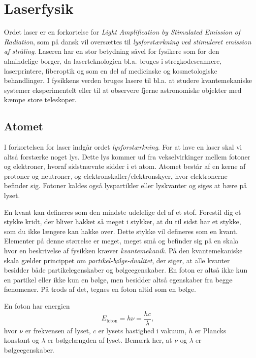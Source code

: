 \chapter{Laserfysik}
Ordet laser er en forkortelse for \emph{Light Amplification by Stimulated Emission of Radiation}, som på dansk vil oversættes til \emph{lysforstærkning ved stimuleret emission af stråling}. Laseren har en stor betydning såvel for fysikere som for den almindelige borger, da laserteknologien bl.a. bruges i stregkodescannere,
laserprintere, fiberoptik og som en del af medicinske og kosmetologiske behandlinger. I fysikkens verden bruges lasere til bl.a. at studere kvantemekaniske systemer eksperimentelt eller til at observere fjerne astronomiske objekter med kæmpe store teleskoper. 


\section{Atomet}
I forkortelsen for laser indgår ordet \emph{lysforstærkning}. For at lave en laser skal vi altså forstærke noget lys. Dette lys kommer ud fra vekselvirkinger mellem fotoner og elektroner, hvoraf sidstnævnte sidder i et atom. Atomet består af en kerne af protoner og neutroner, og elektronskaller/elektronskyer, hvor elektronerne befinder sig. Fotoner kaldes også lyspartikler eller lyskvanter og siges at bære på lyset. 

En kvant kan defineres som den mindste udelelige del af et stof. Forestil dig et stykke kridt, der bliver hakket så meget i stykker, at du til sidst har et stykke, som du ikke længere kan hakke over. Dette stykke vil defineres som en kvant. Elementer på denne størrelse er meget, meget små og befinder sig på en skala hvor en beskrivelse af fysikken kræver \emph{kvantemekanik}. På den kvantemekaniske skala gælder princippet om \emph{partikel-bølge-dualitet}, der siger, at alle kvanter besidder både partikelegenskaber og bølgeegenskaber. En foton er altså ikke kun en partikel eller ikke kun en bølge, men besidder altså egenskaber fra begge fænomener. På trods af det, tegnes en foton altid som en bølge.  

En foton har energien 
\begin{equation}
E_{\text{foton}} = h\nu = \frac{hc}{\lambda},
\end{equation}
hvor $\nu$ er frekvensen af lyset, $c$ er lysets hastighed i vakuum, $h$ er Plancks konstant og $\lambda$ er bølgelængden af lyset. Bemærk her, at $\nu$ og $\lambda$ er bølgeegenskaber. 

